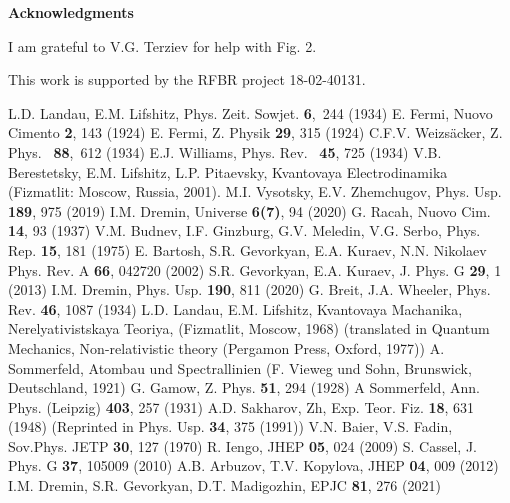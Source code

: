 \documentclass[12pt]{article}
\begin{document}
\vspace{6pt}
{\bf Acknowledgments}

I am grateful to V.G. Terziev for help with Fig. 2.

This work is supported by the RFBR project 18-02-40131.

\vspace{6pt}

\begin{thebibliography}{999}
L.D. Landau, E.M. Lifshitz, Phys. Zeit. Sowjet. {\bf 6},~244 (1934)
E. Fermi, Nuovo Cimento {\bf 2}, 143 (1924)
E. Fermi, Z. Physik {\bf 29}, 315 (1924) 
C.F.V. Weizs\"{a}cker, Z. Phys. ~{\bf 88},~612 (1934)
E.J. Williams, Phys. Rev. ~{\bf 45}, 725 (1934)
V.B. Berestetsky, E.M. Lifshitz, L.P. Pitaevsky, 
Kvantovaya Electrodinamika
(Fizmatlit: Moscow, Russia, 2001).
M.I. Vysotsky, E.V. Zhemchugov, Phys. Usp. {\bf 189}, 975 (2019)
I.M. Dremin, Universe {\bf 6(7)}, 94 (2020)
G. Racah, Nuovo Cim. {\bf 14}, 93 (1937)
V.M. Budnev, I.F. Ginzburg, G.V. Meledin, V.G. Serbo, Phys. Rep. {\bf 15}, 181 
(1975)
E. Bartosh, S.R. Gevorkyan, E.A. Kuraev, N.N. Nikolaev
Phys. Rev. A {\bf 66}, 042720 (2002)
S.R. Gevorkyan, E.A. Kuraev, J. Phys. G {\bf 29}, 1 (2013) 
I.M. Dremin,  Phys. Usp. {\bf 190}, 811 (2020) 
G. Breit, J.A. Wheeler, Phys. Rev. {\bf 46}, 1087 (1934)
L.D. Landau, E.M. Lifshitz, Kvantovaya Machanika, Nerelyativistskaya Teoriya,
(Fizmatlit, Moscow, 1968) (translated in Quantum Mechanics, Non-relativistic 
theory (Pergamon Press, Oxford, 1977))
A. Sommerfeld, Atombau und Spectrallinien (F. Vieweg und Sohn, Brunswick, 
Deutschland, 1921)
G. Gamow, Z. Phys. {\bf 51}, 294 (1928)
A Sommerfeld, Ann. Phys. (Leipzig) {\bf 403}, 257 (1931)
A.D. Sakharov, Zh, Exp. Teor. Fiz. {\bf 18}, 631 (1948) (Reprinted in
Phys. Usp. {\bf 34}, 375 (1991))
V.N. Baier, V.S. Fadin, Sov.Phys. JETP {\bf 30}, 127 (1970)
R. Iengo, JHEP {\bf 05}, 024 (2009)
S. Cassel, J. Phys. G {\bf 37}, 105009 (2010)
A.B. Arbuzov, T.V. Kopylova, JHEP {\bf 04}, 009 (2012)
I.M. Dremin, S.R. Gevorkyan, D.T. Madigozhin, EPJC {\bf 81}, 276 (2021)
\end{thebibliography}
\end{document}
